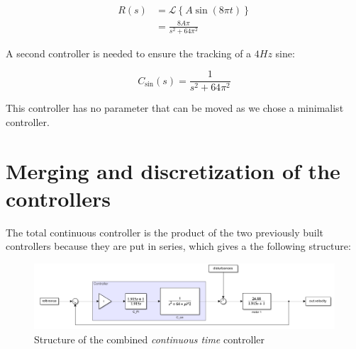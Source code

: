 \begin{align}
    R(s) &= \mathcal{L}\left\{A \sin (8 \pi t)\right\} \\
    &= \frac{8 A \pi}{s^2 + 64\pi^2}
\end{align}

A second controller is needed to ensure the tracking of a $4 Hz$ sine:

\begin{equation}
    C_{\sin}(s) = \frac{1}{s^2 + 64\pi^2}
    \label{eq:controller_sin}
\end{equation}

This controller has no parameter that can be moved as we chose a minimalist controller. 

\section{Merging and discretization of the controllers}

The total continuous controller is the product of the two previously built controllers because they are put in series, 
which gives a the following structure:

\begin{figure}[H]
    \centering
    \includegraphics[width=\textwidth]{Pictures/controller_structure.png}
    \caption{Structure of the combined \textit{continuous time} controller}
    \label{fig:controller_structure}
\end{figure}

